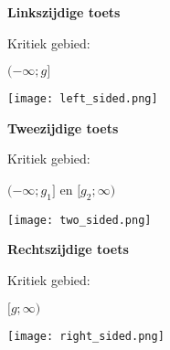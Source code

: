     \begin{minipage}{0.32\linewidth}
        \begin{center}
            {\bfseries Linkszijdige toets}
            
            Kritiek gebied:
            
            {\color{red} $(-\infty; g]$}
            
            \texttt{[image: left\_sided.png]}
        \end{center}
    \end{minipage}
    \hfill
    \begin{minipage}{0.32\linewidth}
        \begin{center}
            {\bfseries Tweezijdige toets}
            
            Kritiek gebied: 
            
            {\color{red} $(-\infty; g_1]$ en $[g_2; \infty)$}
            
            \texttt{[image: two\_sided.png]}
        \end{center}
    \end{minipage}
    \hfill
    \begin{minipage}{0.32\linewidth}
        \begin{center}
            {\bfseries Rechtszijdige toets}
            
            Kritiek gebied:  
            
            {\color{red} $[g; \infty)$}
            
            \texttt{[image: right\_sided.png]}
        \end{center}
    \end{minipage}

